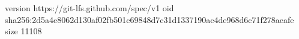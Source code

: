 version https://git-lfs.github.com/spec/v1
oid sha256:2d5a4e8062d130af02fb501c69848d7c31d1337190ac4de968d6c71f278aeafe
size 11108
